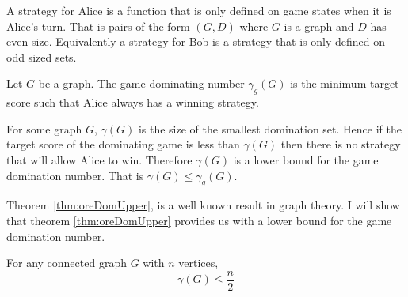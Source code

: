 A strategy for Alice is a function that is only defined on game states when it is Alice's turn. That is pairs of the form $(G,D)$ where $G$ is a graph and $D$ has even size. Equivalently a strategy for Bob is a strategy that is only defined on odd sized sets. 

\begin{definition}
    Let $G$ be a graph. The game dominating number $\gamma_g(G)$ is the minimum target score such that Alice always has a winning strategy.
\end{definition} 

%        
%
%    
%
%
%
%
%    
    
For some graph $G$, $\gamma(G)$ is the size of the smallest domination set. Hence if the target score of the dominating game is less than $\gamma(G)$ then there is no strategy that will allow Alice to win. Therefore $\gamma(G)$ is a lower bound for the game domination number. That is $\gamma(G)\leq\gamma_g(G)$. 

Theorem \ref{thm:oreDomUpper}, is a well known result in graph theory. I will show that theorem \ref{thm:oreDomUpper} provides us with a lower bound for the game domination number.

\begin{theorem} \label{thm:oreDomUpper} 
    For any connected graph $G$ with $n$ vertices,     
    \[\gamma(G) \leq \frac{n}{2}\]
\end{theorem}

